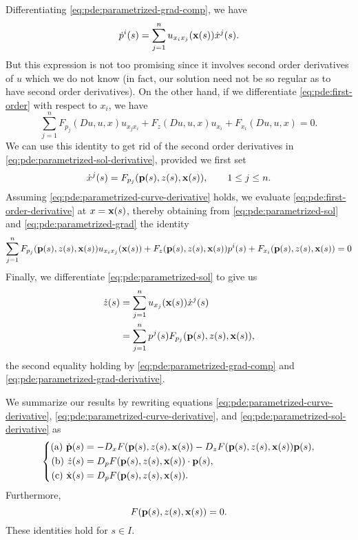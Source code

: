 Differentiating \eqref{eq:pde:parametrized-grad-comp}, we have
\begin{equation}
  \label{eq:pde:parametrized-grad-derivative}
  \dot p^i(s)=\sum_{j=1}^n u_{x_ix_j}(\mathbf{x}(s))\dot x^j(s).
\end{equation}
But this expression is not too promising since it involves second order
derivatives of \(u\) which we do not know (in fact, our solution need not
be so regular as to have second order derivatives). On the other hand, if
we differentiate \eqref{eq:pde:first-order} with respect to \(x_i\), we
have
\begin{equation}
  \label{eq:pde:first-order-derivative}
  \sum_{j=1}^n F_{p_j}(Du,u,x)u_{x_jx_i}+F_z(Du,u,x)u_{x_i}+F_{x_i}(Du,u,x)=0.
\end{equation}
We can use this identity to get rid of the second order derivatives in
\eqref{eq:pde:parametrized-sol-derivative}, provided we first set
\begin{equation}
  \label{eq:pde:parametrized-curve-derivative}
  \dot x^j(s)=F_{p_j}(\mathbf{p}(s),z(s),\mathbf{x}(s)),\qquad 1\leq j\leq n.
\end{equation}
Assuming \eqref{eq:pde:parametrized-curve-derivative} holds, we evaluate
\eqref{eq:pde:first-order-derivative} at \(x=\mathbf{x}(s)\), thereby obtaining
from \eqref{eq:pde:parametrized-sol} and \eqref{eq:pde:parametrized-grad}
the identity
\[
  \sum_{j=1}^n F_{p_j}(\mathbf{p}(s),z(s),\mathbf{x}(s))u_{x_ix_j}(\mathbf{x}(s))+
  F_z(\mathbf{p}(s),z(s),\mathbf{x}(s))p^i(s)+F_{x_i}(\mathbf{p}(s),z(s),\mathbf{x}(s))=0
\]
Finally, we differentiate \eqref{eq:pde:parametrized-sol} to give us
\begin{equation}
  \label{eq:pde:parametrized-sol-derivative}
  \begin{aligned}
    \dot z(s)
    &=\sum_{j=1}^n u_{x_j}(\mathbf{x}(s))\dot x^j(s)\\
    &=\sum_{j=1}^n p^j(s)F_{p_j}(\mathbf{p}(s),z(s),\mathbf{x}(s)),
  \end{aligned}
\end{equation}
the second equality holding by \eqref{eq:pde:parametrized-grad-comp} and
\eqref{eq:pde:parametrized-grad-derivative}.

We summarize our results by rewriting equations
\eqref{eq:pde:parametrized-curve-derivative},
\eqref{eq:pde:parametrized-curve-derivative}, and
\eqref{eq:pde:parametrized-sol-derivative} as
\begin{equation}
  \label{eq:pde:first-order-characteristics}
  \left\{
    \begin{aligned}
      \text{(a) }
      \dot{\mathbf{p}}(s)&=
      -D_xF(\mathbf{p}(s),z(s),\mathbf{x}(s))-D_zF(\mathbf{p}(s),z(s),\mathbf{x}(s))\mathbf{p}(s),\\
      \text{(b) }
      \dot z(s)&=
      D_pF(\mathbf{p}(s),z(s),\mathbf{x}(s))\cdot\mathbf{p}(s),\\
      \text{(c) }
      \dot{\mathbf{x}}(s)&=D_pF(\mathbf{p}(s),z(s),\mathbf{x}(s)).
    \end{aligned}
  \right.
\end{equation}
Furthermore,
\begin{equation}
  \label{eq:pde:first-order-pzx}
  F(\mathbf{p}(s),z(s),\mathbf{x}(s))=0.
\end{equation}
These identities hold for \(s\in I\).

